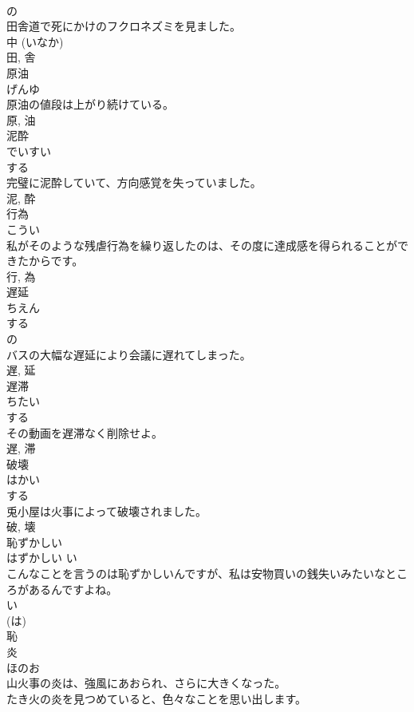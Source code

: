 \documentclass[8pt]{extreport}
\begin{document}
\begin{CJK}{UTF8}{min}
\\	の 
\\	田舎道で死にかけのフクロネズミを見ました。	
\\	中 (いなか) 
\\	田, 舎	
\\	原油	
\\	げんゆ	
\\	原油の値段は上がり続けている。	
\\	原, 油	
\\	泥酔	
\\	でいすい	
\\	する 
\\	完璧に泥酔していて、方向感覚を失っていました。	
\\	泥, 酔	
\\	行為	
\\	こうい	
\\	私がそのような残虐行為を繰り返したのは、その度に達成感を得られることができたからです。	
\\	行, 為	
\\	遅延	
\\	ちえん	
\\	する 
\\	の 
\\	バスの大幅な遅延により会議に遅れてしまった。	
\\	遅, 延	
\\	遅滞	
\\	ちたい	
\\	する 
\\	その動画を遅滞なく削除せよ。	
\\	遅, 滞	
\\	破壊	
\\	はかい	
\\	する 
\\	兎小屋は火事によって破壊されました。	
\\	破, 壊	
\\	恥ずかしい	
\\	はずかしい	い 
\\	こんなことを言うのは恥ずかしいんですが、私は安物買いの銭失いみたいなところがあるんですよね。	
\\	い 
\\	(は) 
\\	恥	
\\	炎	
\\	ほのお	
\\	山火事の炎は、強風にあおられ、さらに大きくなった。	
\\	たき火の炎を見つめていると、色々なことを思い出します。	

\end{CJK}
\end{document}
